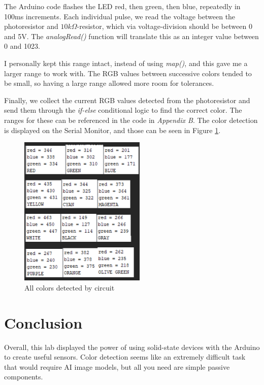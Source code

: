 \documentclass{IEEEtran}
\begin{document}
The Arduino code flashes the LED red, then green, then blue, repeatedly in 100ms increments. Each individual pulse, we read the voltage between the photoresistor and \(10k\Omega\)-resistor, which via voltage-division should be between 0 and 5V. The \textit{analogRead()} function will translate this as an integer value between 0 and 1023. 

I personally kept this range intact, instead of using \textit{map()}, and this gave me a larger range to work with. The RGB values between successive colors tended to be small, so having a large range allowed more room for tolerances.

Finally, we collect the current RGB values detected from the photoresistor and send them through the \textit{if-else} conditional logic to find the correct color. The ranges for these can be referenced in the code in \textit{Appendix B}. The color detection is displayed on the Serial Monitor, and those can be seen in Figure \ref{fig:colorsDetected}.

\begin{figure}[!ht] 
    \centering
    \includegraphics[width = 6cm]{colors-detected.png}
    \caption{All colors detected by circuit}
    \label{fig:colorsDetected}
\end{figure}

\section{Conclusion}

Overall, this lab displayed the power of using solid-state devices with the Arduino to create useful sensors. Color detection seems like an extremely difficult task that would require AI image models, but all you need are simple passive components.
\end{document}
